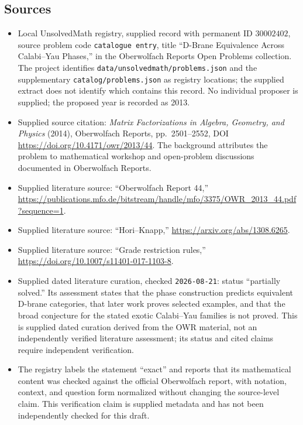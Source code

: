 \documentclass[11pt]{article}
\begin{document}
\subsection{Sources}
\begin{itemize}
\item Local UnsolvedMath registry, supplied record with permanent ID \(30002402\), source problem code \texttt{catalogue entry}, title ``D-Brane Equivalence Across Calabi--Yau Phases,'' in the Oberwolfach Reports Open Problems collection. The project identifies \texttt{data/unsolvedmath/problems.json} and the supplementary \texttt{catalog/problems.json} as registry locations; the supplied extract does not identify which contains this record. No individual proposer is supplied; the proposed year is recorded as 2013.
\item Supplied source citation: \emph{Matrix Factorizations in Algebra, Geometry, and Physics} (2014), Oberwolfach Reports, pp.~2501--2552, DOI \url{https://doi.org/10.4171/owr/2013/44}. The background attributes the problem to mathematical workshop and open-problem discussions documented in Oberwolfach Reports.
\item Supplied literature source: ``Oberwolfach Report 44,'' \url{https://publications.mfo.de/bitstream/handle/mfo/3375/OWR_2013_44.pdf?sequence=1}.
\item Supplied literature source: ``Hori--Knapp,'' \url{https://arxiv.org/abs/1308.6265}.
\item Supplied literature source: ``Grade restriction rules,'' \url{https://doi.org/10.1007/s11401-017-1103-8}.
\item Supplied dated literature curation, checked \texttt{2026-08-21}: status ``partially solved.'' Its assessment states that the phase construction predicts equivalent D-brane categories, that later work proves selected examples, and that the broad conjecture for the stated exotic Calabi--Yau families is not proved. This is supplied dated curation derived from the OWR material, not an independently verified literature assessment; its status and cited claims require independent verification.
\item The registry labels the statement ``exact'' and reports that its mathematical content was checked against the official Oberwolfach report, with notation, context, and question form normalized without changing the source-level claim. This verification claim is supplied metadata and has not been independently checked for this draft.
\end{itemize}
\end{document}
